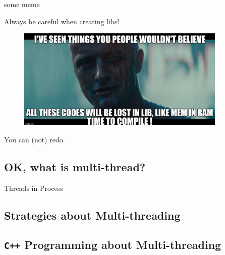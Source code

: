 \begin{frame}{some meme}
    \begin{block}{Always be careful when creating libs!}
        \begin{figure}[htbp!]
            \includegraphics[width=10cm]{img/week7/lib_meme.jpg}
        \end{figure}
        You can (not) redo.
    \end{block}
\end{frame}

\subsection{OK, what is multi-thread?}
\begin{frame}{Threads in Process}
\end{frame}
\subsection{Strategies about Multi-threading}
\subsection{\texttt{C++} Programming about Multi-threading}
